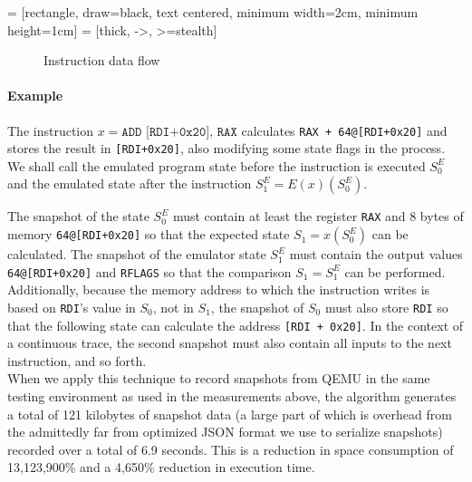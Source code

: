  = [rectangle, draw=black, text centered, minimum width=2cm, minimum height=1cm]
 = [thick, ->, >=stealth]

\begin{figure}[htpb]
\begin{center}
\end{center}
\caption{Instruction data flow}%
\label{fig:instr_data_flow}
\end{figure}

\paragraph{Example} The instruction $x = \texttt{ADD [RDI+0x20], RAX}$ calculates \texttt{RAX + 64@[RDI+0x20]} and
stores the result in \texttt{[RDI+0x20]}, also modifying some state flags in the process. We shall call the emulated
program state before the instruction is executed $S^E_0$ and the emulated state after the instruction $S^E_1 =
E(x)(S^E_0)$.

The snapshot of the state $S^E_0$ must contain at least the register \texttt{RAX} and 8 bytes of memory
\texttt{64@[RDI+0x20]} so that the expected state $S_1 = x(S^E_0)$ can be calculated. The snapshot of the emulator state
$S^E_1$ must contain the output values \texttt{64@[RDI+0x20]} and \texttt{RFLAGS} so that the comparison $S_1 = S^E_1$
can be performed. Additionally, because the memory address to which the instruction writes is based on \texttt{RDI}'s
value in $S_0$, not in $S_1$, the snapshot of $S_0$ must also store \texttt{RDI} so that the following state can
calculate the address \texttt{[RDI + 0x20]}. In the context of a continuous trace, the second snapshot must also contain
all inputs to the next instruction, and so forth.
\\

When we apply this technique to record snapshots from QEMU in the same testing environment as used in the measurements
above, the algorithm generates a total of 121 kilobytes of snapshot data (a large part of which is overhead from the
admittedly far from optimized JSON format we use to serialize snapshots) recorded over a total of 6.9 seconds. This is a
reduction in space consumption of 13,123,900\% and a 4,650\% reduction in execution time.

